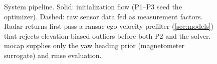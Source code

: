 \begin{figure}[t]
{%
}%
\caption{System pipeline. Solid: initialization flow (P1--P3 seed
the optimizer). Dashed: raw sensor data fed as measurement factors.
Radar returns first pass a \ac{ransac} ego-velocity prefilter
(\autoref{sec:models}) that rejects elevation-biased outliers before
both P2 and the solver. \ac{mocap} supplies only the yaw heading prior
(magnetometer surrogate) and \ac{rmse} evaluation.}
\label{fig:pipeline}
\end{figure}
